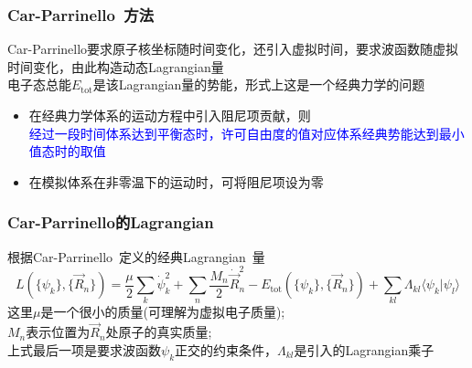 \frame
{
	\frametitle{\textrm{Car-Parrinello~}方法}
	{\fontsize{6.2pt}{5.2pt}}
	\vskip 5pt
	\textrm{Car-Parrinello}要求原子核坐标随时间变化，还引入虚拟时间，要求波函数随虚拟时间变化，由此构造动态\textrm{Lagrangian}量\\
	{\fontsize{6.2pt}{5.2pt}}
	电子态总能$E_{\mathrm{tot}}$是该\textrm{Lagrangian}量的势能，形式上这是一个经典力学的问题
	\begin{itemize}
		\item 在经典力学体系的运动方程中引入阻尼项贡献，则\\
			\textcolor{blue}{经过一段时间体系达到平衡态时，许可自由度的值对应体系经典势能达到最小值态时的取值}
		\item 在模拟体系在非零温下的运动时，可将阻尼项设为零
	\end{itemize}
}

\frame
{
	\frametitle{\textrm{Car-Parrinello}的\textrm{Lagrangian}}
	根据\textrm{Car-Parrinello~}定义的经典\textrm{Lagrangian~}量
	{\fontsize{9.0pt}{5.2pt}\selectfont
	\begin{displaymath}
		L(\{\psi_k\},\{\vec R_n\})=\frac{\mu}2\sum_k\dot{\psi}_k^2+\sum_n\frac{M_n}2\dot{\vec R}_n^2-E_{\mathrm{tot}}(\{\psi_k\},\{\vec R_n\})+\sum_{kl}\Lambda_{kl}\langle\psi_k|\psi_l\rangle
	\end{displaymath}}
	这里$\mu$是一个很小的质量(可理解为虚拟电子质量);\\
	$M_n$表示位置为$\vec R_n$处原子的真实质量;~\\
	上式最后一项是要求波函数$\psi_k$正交的约束条件，$\Lambda_{kl}$是引入的\textrm{Lagrangian}乘子
\vskip 5pt
{\fontsize{7.2pt}{5.2pt}}
}


